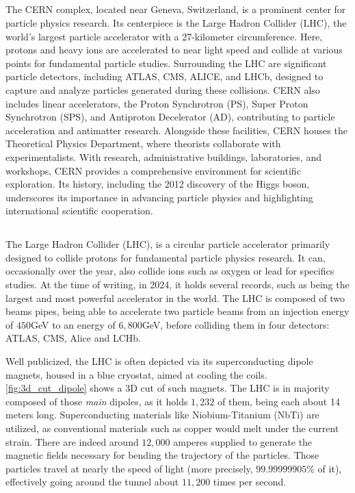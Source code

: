 \subsection{}


The CERN complex, located near Geneva, Switzerland, is a prominent center for particle physics
research. Its centerpiece is the Large Hadron Collider (LHC), the world's largest particle
accelerator with a 27-kilometer circumference. Here, protons and heavy ions are accelerated to near
light speed and collide at various points for fundamental particle studies. Surrounding the LHC are
significant particle detectors, including ATLAS, CMS, ALICE, and LHCb, designed to capture and
analyze particles generated during these collisions.  CERN also includes linear accelerators, the
Proton Synchrotron (PS), Super Proton Synchrotron (SPS), and Antiproton Decelerator (AD),
contributing to particle acceleration and antimatter research. Alongside these facilities, CERN
houses the Theoretical Physics Department, where theorists collaborate with experimentalists. With
research, administrative buildings, laboratories, and workshops, CERN provides a comprehensive
environment for scientific exploration. Its history, including the 2012 discovery of the Higgs
boson, underscores its importance in advancing particle physics and highlighting international
scientific cooperation.



\subsection{}

The Large Hadron Collider (LHC), is a circular particle accelerator primarily designed to collide
protons for fundamental particle physics research. It can, occasionally over the year, also collide
ions such as oxygen or lead for specifics studies. At the time of writing, in 2024, it holds several
records, such as being the largest and most powerful accelerator in the world. The LHC is composed
of two beams pipes, being able to accelerate two particle beams from an injection energy of $450$GeV
to an energy of $6,800$GeV, before colliding them in four detectors: ATLAS, CMS, Alice and LCHb.

Well publicized, the LHC is often depicted via its superconducting dipole magnets, housed in a blue
cryostat, aimed at cooling the coils. \cref{fig:3d_cut_dipole} shows a 3D cut of such magnets. The
LHC is in majority composed of those \textit{main} dipoles, as it holds $1,232$ of them, being each
about 14 meters long. Superconducting materials like Niobium-Titanium (NbTi) are utilized, as
conventional materials such as copper would melt under the current strain. There are indeed around
$12,000$ amperes supplied to generate the magnetic fields necessary for bending the trajectory of
the particles.
Those particles travel at nearly the speed of light (more precisely, $99.99999905\%$ of it),
effectively going around the tunnel about $11,200$ times per second.

